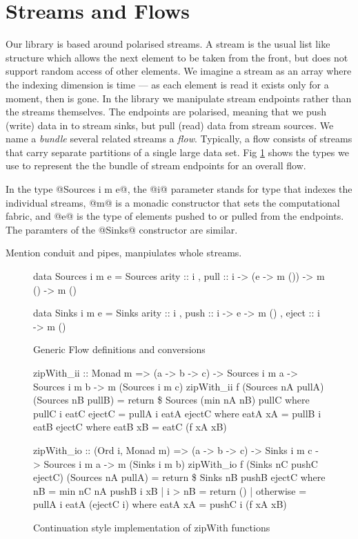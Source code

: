 \clearpage{}
\section{Streams and Flows}

Our library is based around polarised streams. A stream is the usual list like structure which allows the next element to be taken from the front, but does not support random access of other elements. We imagine a stream as an array where the indexing dimension is time --- as each element is read it exists only for a moment, then is gone. In the library we manipulate stream endpoints rather than the streams themselves. The endpoints are polarised, meaning that we push (write) data in to stream sinks, but pull (read) data from stream sources. We name a \emph{bundle} several related streams a \emph{flow}. Typically, a flow consists of streams that carry separate partitions of a single large data set. Fig \ref{f:GenericFlows} shows the types we use to represent the the bundle of stream endpoints for an overall flow.

In the type @Sources i m e@, the @i@ parameter stands for type that indexes the individual streams, @m@ is a monadic constructor that sets the computational fabric, and @e@ is the type of elements pushed to or pulled from the endpoints. The paramters of the @Sinks@ constructor are similar. 

Mention conduit and pipes, manpiulates whole streams.

\begin{figure}
\begin{code}
data Sources i m e = Sources { arity :: i
                             , pull  :: i -> (e -> m ()) -> m ()  -> m () }

data Sinks   i m e = Sinks   { arity :: i
                             , push  :: i -> e -> m ()
                             , eject :: i -> m () }
\end{code}
\label{f:GenericFlows}
\caption{Generic Flow definitions and conversions}
\end{figure}

\begin{figure}
\begin{code}
zipWith_ii :: Monad m => (a -> b -> c)
           -> Sources i m a -> Sources i m b -> m (Sources i m c)
zipWith_ii f (Sources nA pullA) (Sources nB pullB)
 = return \$ Sources (min nA nB) pullC
 where  pullC i eatC ejectC
         = pullA i eatA ejectC
         where  eatA xA = pullB i eatB ejectC
                 where  eatB xB = eatC (f xA xB)

zipWith_io :: (Ord i, Monad m) => (a -> b -> c)
           -> Sinks i m c -> Sources i m a -> m (Sinks i m b)
zipWith_io f (Sinks nC pushC ejectC) (Sources nA pullA)
 = return \$ Sinks nB pushB ejectC
 where  nB = min nC nA
        pushB i xB 
         | i > nB       = return ()
         | otherwise    = pullA i eatA (ejectC i)
         where  eatA xA = pushC i (f xA xB)
\end{code}
\caption{Continuation style implementation of zipWith functions}
\end{figure}

